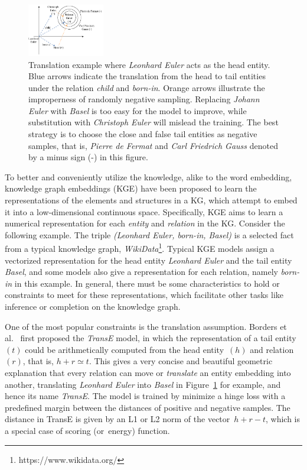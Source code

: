 \documentclass[twocolumn,a4paper,10pt,preprint,3p]{elsarticle}
\begin{document}
\begin{figure}[htb]
    \centering
    \includegraphics[width=0.3\textwidth]{images/translation.pdf}
    \caption{Translation example where \emph{Leonhard Euler} acts as the head entity. Blue arrows indicate the translation from the head to tail entities under the relation \emph{child} and \emph{born-in}. Orange arrows illustrate the improperness of randomly negative sampling. Replacing \emph{Johann Euler} with \emph{Basel} is too easy for the model to improve, while substitution with \emph{Christoph Euler} will mislead the training. The best strategy is to choose the close and false tail entities as negative samples, that is, \emph{Pierre de Fermat} and \emph{Carl Friedrich Gauss} denoted by a minus sign (-) in this figure.}
\label{translation-example}
\end{figure}

To better and conveniently utilize the knowledge, alike to the word embedding, knowledge graph embeddings (KGE) have been proposed to learn the representations of the elements and structures in a KG, which attempt to embed it into a low-dimensional continuous space.  Specifically, KGE aims to learn a numerical  representation for each \emph{entity} and \emph{relation} in the KG. Consider the following example. The triple \emph{(Leonhard Euler, born-in, Basel)} is a selected fact from a typical knowledge graph, \emph{WikiData}\footnote{https://www.wikidata.org/}. Typical KGE models assign a vectorized representation for the head entity \emph{Leonhard Euler} and the tail entity \emph{Basel}, and some models also give a representation for each relation, namely \emph{born-in} in this example. In general, there must be some characteristics to hold or constraints to meet for these representations, which facilitate other tasks like inference or completion on the knowledge graph.

One of the most popular constraints is the translation assumption. Borders et al.~\cite{TransE2013} first proposed the \emph{TransE} model, in which the representation of a tail entity~$(t)$ could be arithmetically computed from the head entity~$(h)$ and relation~$(r)$, that is, $h + r \simeq t$. This gives a very concise and beautiful geometric explanation that every relation can move or \emph{translate} an entity embedding into another, translating \emph{Leonhard Euler} into \emph{Basel} in Figure~\ref{translation-example} for example, and hence its name \emph{TransE}.
The model is trained by minimize a hinge loss with a predefined margin between the distances of positive and negative samples. The distance in TransE is given by an L1 or L2 norm of the vector~$h + r - t$, which is a special case of scoring (or~energy) function.
\end{document}
